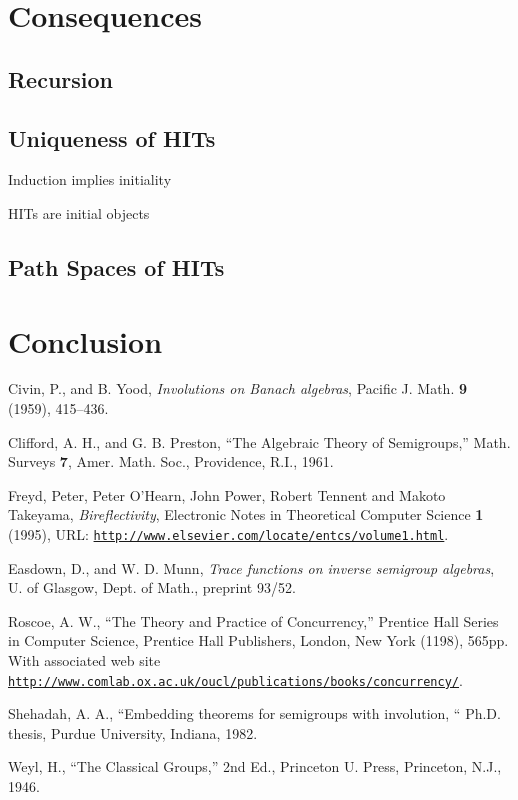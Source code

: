 \documentclass[9pt]{entcs} \usepackage{entcsmacro}
\begin{document}
\section{Consequences}

\subsection{Recursion}

\subsection{Uniqueness of HITs}

\begin{proposition}
Induction implies initiality
\end{proposition}

\begin{corollary}
HITs are initial objects
\end{corollary}

\subsection{Path Spaces of HITs}

\section{Conclusion}

\begin{thebibliography}{10}\label{bibliography}
 Civin, P., and B. Yood, \emph{Involutions on Banach
    algebras}, Pacific J. Math. \textbf{9} (1959), 415--436.
  
 Clifford, A. H., and G. B. Preston, ``The Algebraic
  Theory of Semigroups,'' Math. Surveys \textbf{7}, Amer. Math. Soc.,
  Providence, R.I., 1961.
  
 Freyd, Peter, Peter O'Hearn, John Power, Robert Tennent
  and Makoto Takeyama, \emph{Bireflectivity}, Electronic Notes in
  Theoretical Computer Science {\bf 1} (1995), URL:
  \href{https://www.sciencedirect.com/journal/electronic-notes-in-theoretical-computer-science/vol/1/suppl/C}
  {\texttt{http://www.elsevier.com/locate/entcs/volume1.html}}.
  
 Easdown, D., and W. D. Munn, \emph{Trace functions on
    inverse semigroup algebras}, U. of Glasgow, Dept. of Math.,
  preprint 93/52.

 Roscoe, A. W., ``The Theory and Practice of Concurrency,''
  Prentice Hall Series in Computer Science, Prentice Hall Publishers,
  London, New York (1198), 565pp. With associated web site\\  
  \href{http://www.comlab.ox.ac.uk/oucl/publications/books/concurrency/}
  {\texttt{http://www.comlab.ox.ac.uk/oucl/publications/books/concurrency/}}.
  
 Shehadah, A. A., ``Embedding theorems for semigroups with
  involution, `` Ph.D.  thesis, Purdue University, Indiana, 1982.
  
 Weyl, H., ``The Classical Groups,'' 2nd Ed., Princeton U.
  Press, Princeton, N.J., 1946.

\end{thebibliography}
\end{document}
